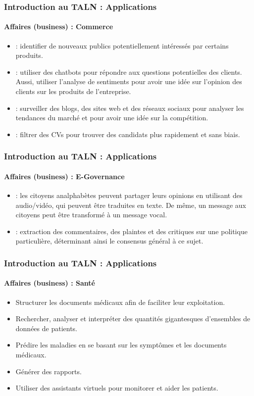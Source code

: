 \documentclass[xcolor=table]{beamer}
\begin{document}
\begin{frame}
\frametitle{Introduction au TALN : Applications}
\framesubtitle{Affaires (business) : Commerce}

\begin{itemize}
	\item {} : identifier de nouveaux publics potentiellement intéressés par certains produits.
	\item {} : utiliser des chatbots pour répondre aux questions potentielles des clients. 
	Aussi, utiliser l'analyse de sentiments pour avoir une idée sur l'opinion des clients sur les produits de l'entreprise.
	\item {} : surveiller des blogs, des sites web et des réseaux sociaux pour analyser les tendances du marché et pour avoir une idée sur la compétition.
	\item {} : filtrer des CVs pour trouver des candidats plus rapidement et sans biais.
\end{itemize}

\end{frame}

\begin{frame}
\frametitle{Introduction au TALN : Applications}
\framesubtitle{Affaires (business) : E-Governance}

\begin{itemize}
	\item {} : les citoyens analphabètes peuvent partager leurs opinions en utilisant des audio/vidéo, qui peuvent être traduites en texte. De même, un message aux citoyens peut être transformé à un message vocal.
	\item {} : extraction des commentaires, des plaintes et des critiques sur une politique particulière, déterminant ainsi le consensus général à ce sujet.
\end{itemize}

\end{frame}

\begin{frame}
\frametitle{Introduction au TALN : Applications}
\framesubtitle{Affaires (business) : Santé}

\begin{itemize}
	\item Structurer les documents médicaux afin de faciliter leur exploitation.
	\item Rechercher, analyser et interpréter des quantités gigantesques d'ensembles de données de patients.
	\item Prédire les maladies en se basant sur les symptômes et les documents médicaux.
	\item Générer des rapports. 
	\item Utiliser des assistants virtuels pour monitorer et aider les patients.
\end{itemize}

\end{frame}
\end{document}

